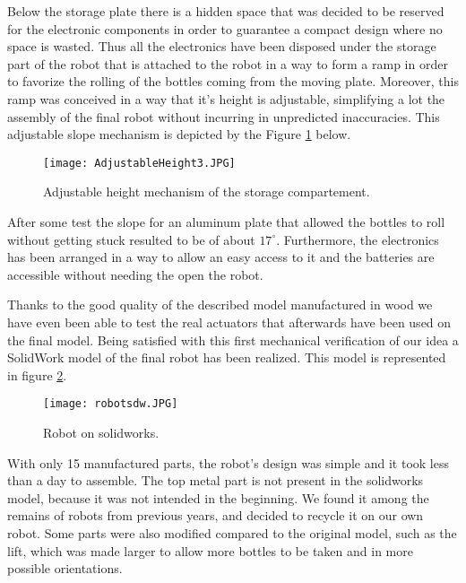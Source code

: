 Below the storage plate there is a hidden space that was decided to be reserved for the electronic components in order to guarantee a compact design where no space is wasted.
Thus all the electronics have been disposed under the storage part of the robot that is attached to the robot in a way to form a ramp in order to favorize the rolling of the bottles coming from the moving plate.
Moreover, this ramp was conceived in a way that it's height is adjustable, simplifying a lot the assembly of the final robot without incurring in unpredicted inaccuracies.
This adjustable slope mechanism is depicted by the Figure \ref{fig:AdjustableHeight3} below.

\begin{figure}[H]
 \centering
 \texttt{[image: AdjustableHeight3.JPG]}
 \caption{Adjustable height mechanism of the storage compartement.}
\label{fig:AdjustableHeight3}
\end{figure}

After some test the slope for an aluminum plate that allowed the bottles to roll without getting stuck resulted to be of about $17^{\circ}$.
Furthermore, the electronics has been arranged in a way to allow an easy access to it and the batteries are accessible without needing the open the robot.

Thanks to the good quality of the described model manufactured in wood we have even been able to test the real actuators that afterwards have been used on the final model.
Being satisfied with this first mechanical verification of our idea a SolidWork model of the final robot has been realized.
This model is represented in figure \ref{fig:robotsdw}.

\begin{figure}[H]
 \centering
 \texttt{[image: robotsdw.JPG]}
 \caption{Robot on solidworks.}
\label{fig:robotsdw}
\end{figure}

With only 15 manufactured parts, the robot's design was simple and it took less than a day to assemble. The top metal part is not present in the solidworks model, because it was not intended in the beginning. We found it among the remains of robots from previous years, and decided to recycle it on our own robot. 
Some parts were also modified compared to the original model, such as the lift, which was made larger to allow more bottles to be taken and in more possible orientations.  \\

